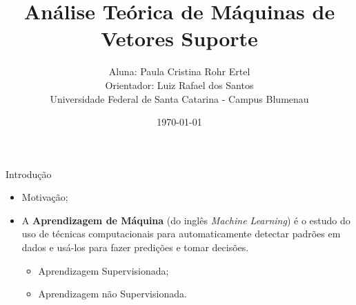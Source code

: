 \documentclass[12pt]{beamer}
\title{Análise Teórica de Máquinas de Vetores Suporte}
\author{Aluna: Paula Cristina Rohr Ertel \\ Orientador: Luiz Rafael dos Santos \\ Universidade Federal de Santa Catarina - Campus Blumenau}
\date{\today}
\theoremstyle{definition}%
\begin{document}
\begin{frame}
	\maketitle
\end{frame}


\begin{frame}{Introdução}
\begin{itemize}
	\item Motivação;
	\item A \textbf{Aprendizagem de Máquina} (do inglês \textit{Machine Learning}) é o estudo do uso de técnicas computacionais para automaticamente detectar padrões em dados e usá-los para fazer predições e tomar decisões.
	\begin{itemize}
		\item Aprendizagem Supervisionada;
		\item Aprendizagem não Supervisionada.	
	\end{itemize}
\end{itemize}
\end{frame}
%
%
%	
%	
%	
%
%
\end{document}
